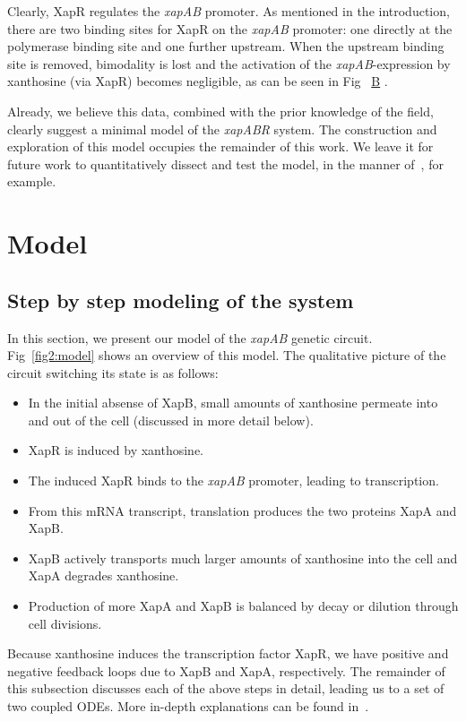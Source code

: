 \documentclass[10pt,letterpaper]{article}
\newcommand\subref[2]{%
	\def\myref{\getrefnumber{#1}}%
	\hyperref[#1]{\myref\mbox{#2}}%
}
\begin{document}
	Clearly, XapR regulates the \emph{xapAB} promoter. As mentioned in
	the introduction, there are two binding sites for XapR on the
	\emph{xapAB} promoter: one directly at the polymerase binding site
	and one further upstream. When the upstream binding site is removed,
	bimodality is lost and the activation of the \emph{xapAB}-expression
	by xanthosine (via XapR) becomes negligible, as can be seen in
	Fig~\subref{fig1:data}{B}.
	
	Already, we believe this data, combined with the prior knowledge of the field, clearly suggest a minimal model of the \emph{xapABR} system. The construction and exploration of this model occupies the remainder of this work. We leave it for future work to quantitatively dissect and test the model, in the manner of~\cite{Garcia2011,RazoMejia2018,Chure2019}, for example.
	
	\section*{Model}
	\subsection*{Step by step modeling of the system}
	In this section, we present our model of the \emph{xapAB} genetic circuit.
	Fig~\ref{fig2:model} shows an overview of this model.
	The qualitative picture of the circuit switching its state is as follows:
	\begin{itemize}
		\item In the initial absense of XapB, small amounts of xanthosine permeate
				into and out of the cell (discussed in more detail below).
		\item XapR is induced by xanthosine.
		\item The induced XapR binds to the \emph{xapAB} promoter, leading to transcription.
		\item From this mRNA transcript, translation produces the two proteins XapA and XapB.
		\item XapB actively transports much larger amounts of xanthosine into the cell and XapA degrades xanthosine.
		\item Production of more XapA and XapB is balanced by decay or dilution through cell divisions.
	\end{itemize}
	Because xanthosine induces the transcription factor XapR, we have positive
	and negative feedback loops due to XapB and XapA, respectively. The remainder
	of this subsection discusses each of the above steps in detail, leading us
	to a set of two coupled ODEs. More in-depth explanations can be found
	in~.
	
\end{document}
